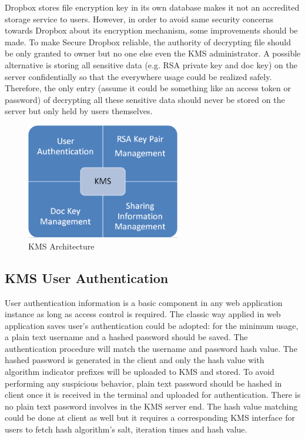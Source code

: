 Dropbox stores file encryption key in its own database makes it not an accredited storage service to users. However, in order to avoid same security concerns towards Dropbox about its encryption mechanism, some improvements should be made. To make Secure Dropbox reliable, the authority of decrypting file should be only granted to owner but no one else even the KMS administrator. A possible alternative is storing all sensitive data (e.g. RSA private key and doc key) on the server confidentially so that the everywhere usage could be realized safely. Therefore, the only entry (assume it could be something like an access token or password) of decrypting all these sensitive data should never be stored on the server but only held by users themselves.

\begin{figure}[h]
        \centering
        \includegraphics[width=0.6\textwidth]{figures/KMS_Architecture.png}
        \caption[KMS Architecture] {KMS Architecture}
\end{figure}

\subsection{KMS User Authentication}

User authentication information is a basic component in any web application instance as long as access control is required. The classic way applied in web application saves user’s authentication could be adopted: for the minimum usage, a plain text username and a hashed password should be saved. The authentication procedure will match the username and password hash value. The hashed password is generated in the client and only the hash value with algorithm indicator prefixes will be uploaded to KMS and stored. To avoid performing any suspicious behavior, plain text password should be hashed in client once it is received in the terminal and uploaded for authentication. There is no plain text password involves in the KMS server end. The hash value matching could be done at client as well but it requires a corresponding KMS interface for users to fetch hash algorithm’s salt, iteration times and hash value.

